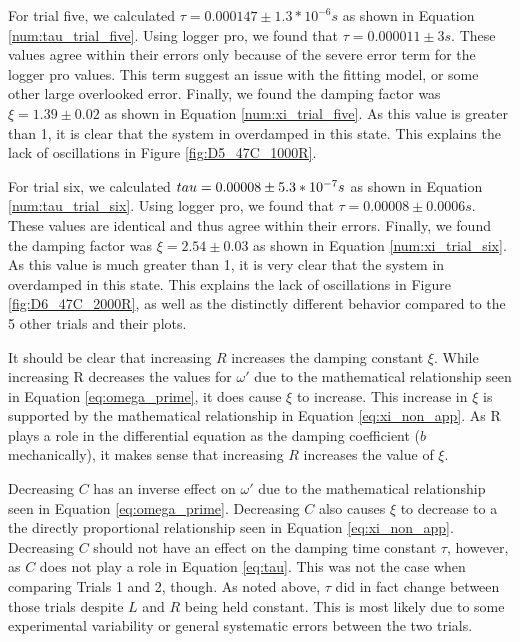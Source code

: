 \documentclass[12pt]{article}
\begin{document}
For trial five, we calculated $\tau=0.000147\pm1.3*10^{-6} s$ as shown in Equation \ref{num:tau_trial_five}. Using logger pro, we found that $\tau=0.000011\pm3 s$. These values agree within their errors only because of the severe error term for the logger pro values. This term suggest an issue with the fitting model, or some other large overlooked error. Finally, we found the damping factor was $\xi=1.39\pm0.02$ as shown in Equation \ref{num:xi_trial_five}. As this value is greater than 1, it is clear that the system in overdamped in this state. This explains the lack of oscillations in Figure \ref{fig:D5_47C_1000R}.

For trial six, we calculated $\\tau=0.00008\pm5.3*10^{-7} s$ as shown in Equation \ref{num:tau_trial_six}. Using logger pro, we found that $\tau=0.00008\pm0.0006 s$. These values are identical and thus agree within their errors. Finally, we found the damping factor was $\xi=2.54\pm0.03$ as shown in Equation \ref{num:xi_trial_six}. As this value is much greater than 1, it is very clear that the system in overdamped in this state. This explains the lack of oscillations in Figure \ref{fig:D6_47C_2000R}, as well as the distinctly different behavior compared to the 5 other trials and their plots.

It should be clear that increasing $R$ increases the damping constant $\xi$. While increasing R decreases the values for $\omega'$ due to the mathematical relationship seen in Equation \ref{eq:omega_prime}, it does cause $\xi$ to increase. This increase in $\xi$ is supported by the mathematical relationship in Equation \ref{eq:xi_non_app}. As R plays a role in the differential equation as the damping coefficient ($b$ mechanically), it makes sense that increasing $R$ increases the value of $\xi$. 

Decreasing $C$ has an inverse effect on $\omega'$ due to the mathematical relationship seen in Equation \ref{eq:omega_prime}. Decreasing $C$ also causes $\xi$ to decrease to a the directly proportional relationship seen in Equation \ref{eq:xi_non_app}. Decreasing $C$ should not have an effect on the damping time constant $\tau$, however, as $C$ does not play a role in Equation \ref{eq:tau}. This was not the case when comparing Trials 1 and 2, though. As noted above, $\tau$ did in fact change between those trials despite $L$ and $R$ being held constant. This is most likely due to some experimental variability or general systematic errors between the two trials.
\end{document}
